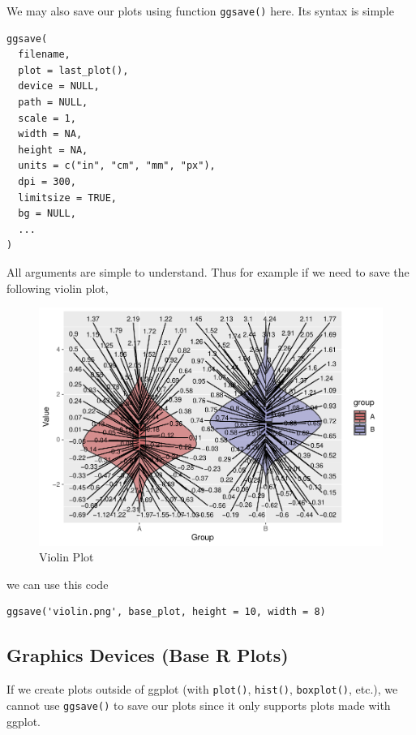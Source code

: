 \documentclass[
]{book}
\begin{document}
We may also save our plots using function \texttt{ggsave()} here. Its syntax is simple

\begin{verbatim}
ggsave(
  filename,
  plot = last_plot(),
  device = NULL,
  path = NULL,
  scale = 1,
  width = NA,
  height = NA,
  units = c("in", "cm", "mm", "px"),
  dpi = 300,
  limitsize = TRUE,
  bg = NULL,
  ...
)
\end{verbatim}

All arguments are simple to understand. Thus for example if we need to save the following violin plot,

\begin{figure}

{\centering \includegraphics[width=0.95\linewidth]{DauR_files/figure-latex/export2-1} 

}

\caption{Violin Plot}\label{fig:export2}
\end{figure}

we can use this code

\begin{verbatim}
ggsave('violin.png', base_plot, height = 10, width = 8)
\end{verbatim}

\hypertarget{graphics-devices-base-r-plots}{%
\subsection*{Graphics Devices (Base R Plots)}\label{graphics-devices-base-r-plots}}

If we create plots outside of ggplot (with \texttt{plot()}, \texttt{hist()}, \texttt{boxplot()}, etc.), we cannot use \texttt{ggsave()} to save our plots since it only supports plots made with ggplot.
\end{document}
